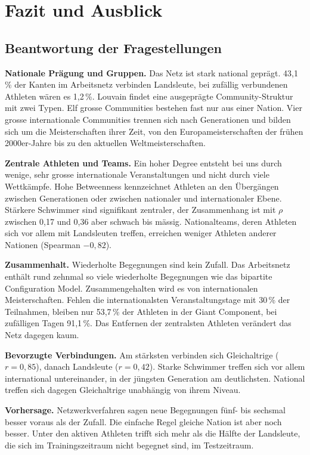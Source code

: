 \section{Fazit und Ausblick}
\label{sec:schluss}

\subsection{Beantwortung der Fragestellungen}
\textbf{Nationale Prägung und Gruppen.} Das Netz ist stark national geprägt.
43,1\,\% der Kanten im Arbeitsnetz verbinden Landsleute, bei zufällig
verbundenen Athleten wären es 1,2\,\%. Louvain findet eine ausgeprägte
Community-Struktur mit zwei Typen. Elf grosse Communities bestehen fast nur
aus einer Nation. Vier grosse internationale Communities trennen sich nach
Generationen und bilden sich um die Meisterschaften ihrer Zeit, von den
Europameisterschaften der frühen 2000er-Jahre bis zu den aktuellen
Weltmeisterschaften.

\textbf{Zentrale Athleten und Teams.} Ein hoher Degree entsteht bei uns
durch wenige, sehr grosse internationale Veranstaltungen und nicht durch
viele Wettkämpfe. Hohe Betweenness kennzeichnet Athleten an den Übergängen
zwischen Generationen oder zwischen nationaler und internationaler Ebene.
Stärkere Schwimmer sind signifikant zentraler, der Zusammenhang ist mit
$\rho$ zwischen 0,17 und 0,36 aber schwach bis mässig. Nationalteams, deren
Athleten sich vor allem mit Landsleuten treffen, erreichen weniger Athleten
anderer Nationen (Spearman $-0{,}82$).

\textbf{Zusammenhalt.} Wiederholte Begegnungen sind kein Zufall. Das
Arbeitsnetz enthält rund zehnmal so viele wiederholte Begegnungen wie das
bipartite Configuration Model. Zusammengehalten wird es von internationalen
Meisterschaften. Fehlen die internationalsten Veranstaltungstage mit 30\,\%
der Teilnahmen, bleiben nur 53,7\,\% der Athleten in der Giant Component,
bei zufälligen Tagen 91,1\,\%. Das Entfernen der zentralsten Athleten
verändert das Netz dagegen kaum.

\textbf{Bevorzugte Verbindungen.} Am stärksten verbinden sich Gleichaltrige
($r = 0{,}85$), danach Landsleute ($r = 0{,}42$). Starke Schwimmer treffen
sich vor allem international untereinander, in der jüngsten Generation am
deutlichsten. National treffen sich dagegen Gleichaltrige unabhängig von
ihrem Niveau.

\textbf{Vorhersage.} Netzwerkverfahren sagen neue Begegnungen fünf- bis
sechsmal besser voraus als der Zufall. Die einfache Regel gleiche Nation ist
aber noch besser. Unter den aktiven Athleten trifft sich mehr als die
Hälfte der Landsleute, die sich im Trainingszeitraum nicht begegnet sind,
im Testzeitraum.

